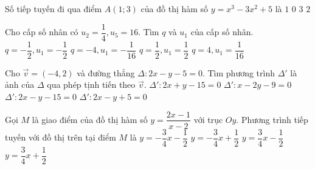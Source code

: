 \begin{ex}%
Số tiếp tuyến đi qua điểm $A\left( 1;3 \right)$ của đồ thị hàm số $y = x^3-3x^2+5$ là
\choice
{\True $1$}
{$0$}
{$3$}
{$2$}
\end{ex}

\begin{ex}%
Cho cấp số nhân có $ u_2=\dfrac{1}{4}, u_5=16 $. Tìm $ q $ và $ u_1 $ của cấp số nhân.
\choice
{$ q= -\dfrac{1}{2}, u_1=-\dfrac{1}{2} $}
{$ q= -4, u_1=-\dfrac{1}{16} $}
{$ q= \dfrac{1}{2}, u_1=\dfrac{1}{2} $}
{\True $ q= 4, u_1=\dfrac{1}{16} $}
\end{ex}

\begin{ex}%
Cho $ \vec{v}=\left(-4,2\right) $ và đường thẳng $ \Delta: 2x-y-5=0 $. Tìm phương trình $ \Delta' $ là ảnh của $ \Delta $ qua phép tịnh tiến theo $ \vec{v} $.
\choice
{$ \Delta': 2x+y-15=0 $}
{$ \Delta': x-2y-9=0 $}
{$ \Delta': 2x-y-15=0 $}
{\True $ \Delta' :2x-y+5=0 $}
\end{ex}

\begin{ex}%
Gọi $ M $ là giao điểm của đồ thị hàm số  $ y=\dfrac{2x-1}{x-2} $ với trục $ Oy $. Phương trình tiếp tuyến với đồ thị trên tại điểm $ M $ là
\choice
{$y =-\dfrac {3}{4}x-\dfrac {1}{2}$}
{\True $y =-\dfrac {3}{4}x+\dfrac {1}{2}$}
{$y = \dfrac {3}{4}x-\dfrac {1}{2}$}
{$y = \dfrac {3}{4}x+\dfrac {1}{2}$}
\end{ex}

